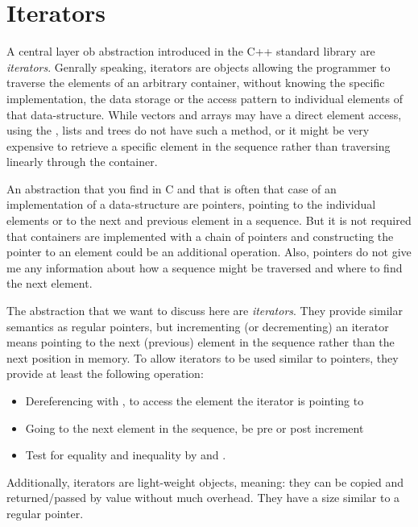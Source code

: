 \chapter{Iterators}
A central layer ob abstraction introduced in the C++ standard library are \emph{iterators}. Genrally speaking, iterators are objects allowing the
programmer to traverse the elements of an arbitrary container, without knowing the specific implementation, the data storage or the access pattern to
individual elements of that data-structure. While vectors and arrays may have a direct element access, using the , lists and trees do
not have such a method, or it might be very expensive to retrieve a specific element in the sequence rather than traversing linearly through the container.

An abstraction that you find in C and that is often that case of an implementation of a data-structure are pointers, pointing to the individual elements or
to the next and previous element in a sequence. But it is not required that containers are implemented with a chain of pointers and constructing the pointer
to an element could be an additional operation. Also, pointers do not give me any information about how a sequence might be traversed and where to find the
next element.

The abstraction that we want to discuss here are \emph{iterators}. They provide similar semantics as regular pointers, but incrementing (or decrementing)
an iterator means pointing to the next (previous) element in the sequence rather than the next position in memory. To allow iterators to be used similar to
pointers, they provide at least the following operation:

\begin{itemize}
  \item Dereferencing with , to access the element the iterator is pointing to
  \item Going to the next element in the sequence, be pre or post increment 
  \item Test for equality and inequality by  and .
\end{itemize}

Additionally, iterators are light-weight objects, meaning: they can be copied and returned/passed by value without much overhead. They have a size similar
to a regular pointer.

